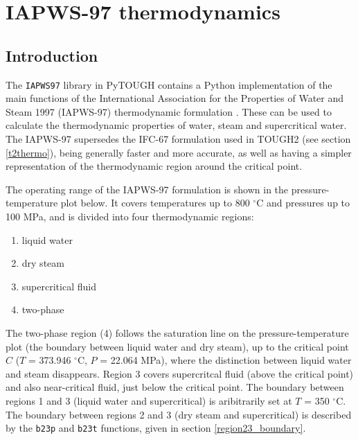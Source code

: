 \chapter{IAPWS-97 thermodynamics}
\label{iapws97}

\section{Introduction}
The \texttt{IAPWS97} library in PyTOUGH contains a Python implementation of the main functions of the International Association for the Properties of Water and Steam 1997 (IAPWS-97) thermodynamic formulation \citep{iapws_2000}.  These can be used to calculate the thermodynamic properties of water, steam and supercritical water.  The IAPWS-97 supersedes the IFC-67 formulation used in TOUGH2 (see section \ref{t2thermo}), being generally faster and more accurate, as well as having a simpler representation of the thermodynamic region around the critical point.

The operating range of the IAPWS-97 formulation is shown in the pressure-temperature plot below.  It covers temperatures up to 800 $^{\circ}$C and pressures up to 100 MPa, and is divided into four thermodynamic regions:

\begin{enumerate}
  \item liquid water
  \item dry steam
  \item supercritical fluid
  \item two-phase
\end{enumerate}

The two-phase region (4) follows the saturation line on the pressure-temperature plot (the boundary between liquid water and dry steam), up to the critical point $C$ ($T$ = 373.946 $^{\circ}$C, $P$ = 22.064 MPa), where the distinction between liquid water and steam disappears.  Region 3 covers supercritcal fluid (above the critical point) and also near-critical fluid, just below the critical point.  The boundary between regions 1 and 3 (liquid water and supercritical) is aribitrarily set at $T$ = 350 $^{\circ}$C.  The boundary between regions 2 and 3 (dry steam and supercritical) is described by the \texttt{b23p} and \texttt{b23t} functions, given in section \ref{region23_boundary}.

